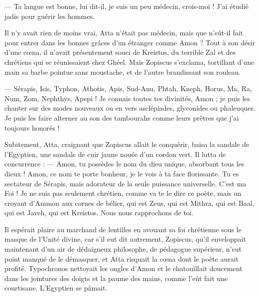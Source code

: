 \documentclass[a4paper, 11pt, oneside, polutonikogreek, french]{article}
\begin{document}
--- Ta langue est bonne, lui dit-il, je suis un peu médecin, crois-moi ! J'ai étudié jadis pour guérir les hommes.

Il n'y avait rien de moins vrai, Atta n'était pas médecin, mais que n'eût-il fait pour entrer dans les bonnes grâces d'un étranger comme Amon ? Tout à son désir d'une cœna, il n'avait présentement souci de Kreistos, du terrible Zal et des chrétiens qui se réunissaient chez Ghéel. Mais Zopiscus s'exclama, tortillant d'une main sa barbe pointue sans moustache, et de l'autre brandissant son rouleau.

--- Sérapis, Isis, Typhon, Athotis, Apis, Sud-Anu, Phtah, Kneph, Horus, Ma, Ra, Num, Zom, Nephthys, Apepi ! Je connais toutes tes divinités, Amon ; je puis les chanter sur des modes nouveaux ou en vers asclépiades, glyconides ou phaleuques. Je puis les faire alterner au son des tambourahs comme leurs prêtres que j'ai toujours honorés !

Subitement, Atta, craignant que Zopiscus allait le conquérir, baisa la sandale de l'Egyptien, une sandale de cuir jaune nouée d'un cordon vert. Il lutta de concurrence : --- Amon, tu possèdes le nom du dieu unique, absorbant tous les dieux ! Amon, ce nom te porte bonheur, je le vois à ta face florissante. Tu es sectateur de Sérapis, mais adorateur de la seule puissance universelle. C'est ma Foi ! Je ne suis pas seulement chrétien, comme va te le dire ce poète, mais un croyant d'Ammon aux cornes de bélier, qui est Zeus, qui est Mithra, qui est Baal, qui est Javeh, qui est Kreistos. Nous nous rapprochons de toi.

Il espérait plaire au marchand de lentilles en avouant sa foi chrétienne sous le masque de l'Unité divine, car s'il eut dit autrement, Zopiscus, qu'il enveloppait maintenant d'un air de dédaigneux philosophe, de pédagogue supérieur, n'eut point manqué de le démasquer, et Atta risquait la cœna dont le poète aurait profité. Typochronos nettoyait les ongles d'Amon et le chatouillait doucement dans les jointures des doigts et la paume des mains, comme l'eût fait une courtisane. L'Egyptien se pâmait.
\end{document}
